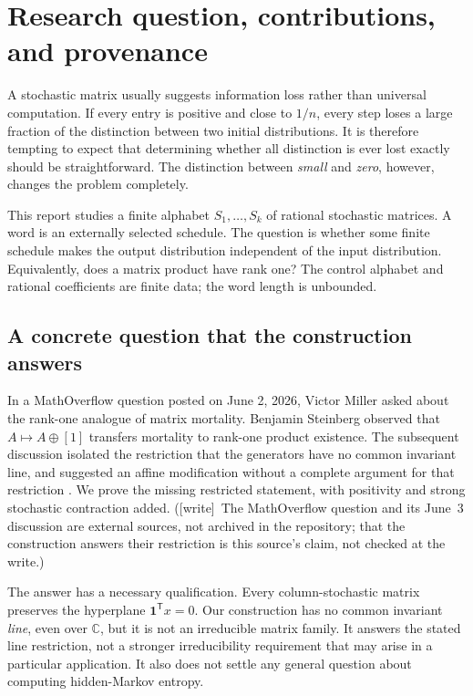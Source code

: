\documentclass[11pt,letterpaper]{article}
\theoremstyle{definition}
\theoremstyle{remark}
\newcommand{\C}{\mathbb C}
\newcommand{\one}{\mathbf 1}
\newcommand{\transpose}{^{\mathsf T}}
\newcommand{\wtag}{\textup{[write]}}
\begin{document}
\section{Research question, contributions, and provenance}
\label{ste:ee:sec:intro}

A stochastic matrix usually suggests information loss rather than universal
computation. If every entry is positive and close to $1/n$, every step loses a
large fraction of the distinction between two initial distributions. It is
therefore tempting to expect that determining whether all distinction is ever
lost exactly should be straightforward. The distinction between \emph{small}
and \emph{zero}, however, changes the problem completely.

This report studies a finite alphabet $S_1,\ldots,S_k$ of rational stochastic
matrices. A word is an externally selected schedule. The question is whether
some finite schedule makes the output distribution independent of the input
distribution. Equivalently, does a matrix product have rank one? The control
alphabet and rational coefficients are finite data; the word length is unbounded.

\subsection{A concrete question that the construction answers}

In a MathOverflow question posted on June 2, 2026, Victor Miller asked about the
rank-one analogue of matrix mortality. Benjamin Steinberg observed that
$A\mapsto A\oplus[1]$ transfers mortality to rank-one product existence. The
subsequent discussion isolated the restriction that the generators have no common
invariant line, and suggested an affine modification without a complete argument
for that restriction \cite{miller}. We prove the missing restricted statement,
with positivity and strong stochastic contraction added.
(\wtag\ The MathOverflow question and its June~3 discussion are external sources, not archived in the repository; that the construction answers their restriction is this source's claim, not checked at the write.)

The answer has a necessary qualification. Every column-stochastic matrix
preserves the hyperplane $\one\transpose x=0$. Our construction has no common
invariant \emph{line}, even over $\C$, but it is not an irreducible matrix family.
It answers the stated line restriction, not a stronger irreducibility requirement
that may arise in a particular application. It also does not settle any general
question about computing hidden-Markov entropy.
\end{document}
